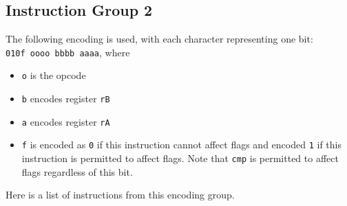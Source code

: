 \documentclass{article}
\begin{document}
	\doublespacing

	\subsection{Instruction Group 2}
	The following encoding is used, with each character representing one
	bit: \\
	\texttt{010f oooo bbbb aaaa}, where

	\singlespacing
	\begin{itemize}
	\item \texttt{o} is the opcode
	\item \texttt{b} encodes register \texttt{rB}
	\item \texttt{a} encodes register \texttt{rA}
	\item \texttt{f} is encoded as \texttt{0} if this instruction
	cannot affect flags and encoded \texttt{1} if this instruction is
	permitted to affect flags. Note that \texttt{cmp} is permitted to
	affect flags regardless of this bit.
	\end{itemize}
	\doublespacing

	Here is a list of instructions from this encoding group.
\end{document}

